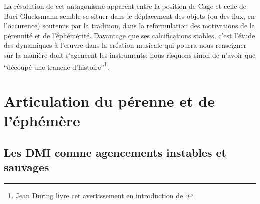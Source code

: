 \indent La résolution de cet antagonisme apparent entre la position de Cage et celle de Buci-Glucksmann semble se situer dans le déplacement des objets (ou des flux, en l'occurence) soutenus par la tradition, dans la reformulation des motivations de la pérennité et de l'éphémérité. Davantage que ses calcifications stables, c'est l'étude des dynamiques à l'œuvre dans la création musicale qui pourra nous renseigner sur la manière dont s'agencent les instruments: nous risquons sinon de n'avoir que ``découpé une tranche d'histoire''\footnote{Jean During livre cet avertissement en introduction de \cite{during_quelque_1994} : }.

\section{Articulation du pérenne et de l'éphémère}

\subsection{Les DMI comme agencements instables et sauvages}

